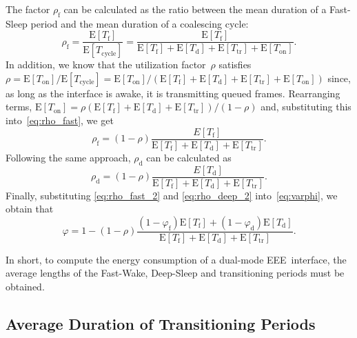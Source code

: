 \documentclass[journal,10pt,letterpaper]{IEEEtran}
\begin{document}
The factor $\rho_{\mathrm{f}}$ can be calculated as the ratio between
the mean duration of a Fast-Sleep period and the mean duration of a
coalescing cycle:
\begin{equation}
  \label{eq:rho_fast}
  \rho_{\mathrm{f}} =
  \frac{\mathrm{E}[T_{\mathrm{f}}]}{\mathrm{E}[T_{\mathrm{cycle}}]} =
  \frac{\mathrm{E}[T_{\mathrm{f}}]}{\mathrm{E}[T_{\mathrm{f}}] +
    \mathrm{E}[T_{\mathrm{d}}] + \mathrm{E}[T_{\mathrm{tr}}] +
    \mathrm{E}[T_{\mathrm{on}}]}.
\end{equation}
In addition, we know that the utilization factor~$\rho$ satisfies
$\rho = \mathrm{E}[T_{\mathrm{on}}]/\mathrm{E}[T_{\mathrm{cycle}}] =
\mathrm{E}[T_{\mathrm{on}}] / (\mathrm{E}[T_{\mathrm{f}}] +
\mathrm{E}[T_{\mathrm{d}}] + \mathrm{E}[T_{\mathrm{tr}}] +
\mathrm{E}[T_{\mathrm{on}}])$ since, as long as the interface is
awake, it is transmitting queued frames. Rearranging terms,
$\mathrm{E}[T_{\mathrm{on}}]=\rho (\mathrm{E}[T_{\mathrm{f}}] +
\mathrm{E}[T_{\mathrm{d}}] + \mathrm{E}[T_{\mathrm{tr}}]) / (1-\rho)$
and, substituting this into~\eqref{eq:rho_fast}, we get
\begin{equation}
  \label{eq:rho_fast_2}
  \rho_{\mathrm{f}} = (1-\rho)
  \frac{E[T_{\mathrm{f}}]}{\mathrm{E}[T_{\mathrm{f}}] +
    \mathrm{E}[T_{\mathrm{d}}] + \mathrm{E}[T_{\mathrm{tr}}]}.
\end{equation}
Following the same approach, $\rho_{\mathrm{d}}$ can be calculated as
\begin{equation}
  \label{eq:rho_deep_2}
  \rho_{\mathrm{d}} = (1-\rho)
  \frac{E[T_{\mathrm{d}}]}{\mathrm{E}[T_{\mathrm{f}}] +
    \mathrm{E}[T_{\mathrm{d}}] + \mathrm{E}[T_{\mathrm{tr}}]}.
\end{equation}
Finally, substituting \eqref{eq:rho_fast_2} and \eqref{eq:rho_deep_2}
into~\eqref{eq:varphi}, we obtain that
\begin{equation}
  \label{eq:varphi_2}
  \varphi = 1 - (1 - \rho) \frac{(1 -
    \varphi_{\mathrm{f}})\mathrm{E}[T_{\mathrm{f}}] + (1 -
    \varphi_{\mathrm{d}})\mathrm{E}[T_{\mathrm{d}}]}{\mathrm{E}[T_{\mathrm{f}}]
    + \mathrm{E}[T_{\mathrm{d}}] + \mathrm{E}[T_{\mathrm{tr}}]}.
\end{equation}

In short, to compute the energy consumption of a dual-mode
EEE~interface, the average lengths of the Fast-Wake, Deep-Sleep and
transitioning periods must be obtained.

\subsection{Average Duration of Transitioning Periods}
\label{sec:trans}
\end{document}
